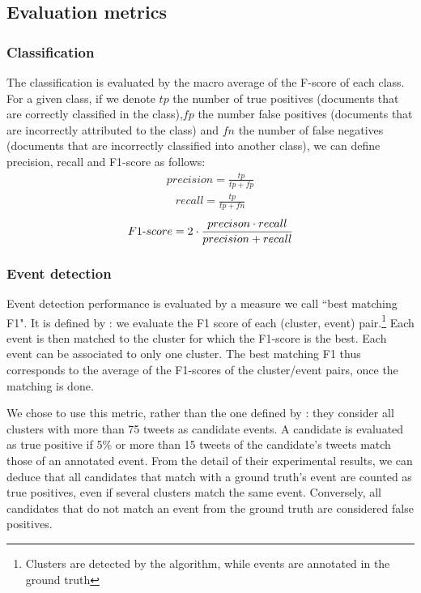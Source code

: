 \subsection{Evaluation metrics}

\subsubsection{Classification}
The classification is evaluated by the macro average of the F-score of each class. For a given class, if we denote $tp$ the number of true positives (documents that are correctly classified in the class),$fp$ the number false positives (documents that are incorrectly attributed to the class) and $fn$ the number of false negatives (documents that are incorrectly classified into another class), we can define precision, recall and F1-score as follows:
\begin{align}
precision = \frac{tp}{tp+fp}
\end{align}
\begin{align}
recall = \frac{tp}{tp+fn}
\end{align}
\begin{align}
F1{\text -}score = 2 \cdot \frac{precison \cdot recall}{precision + recall}
\end{align}

\subsubsection{Event detection}
\label{metric_best_matching}
Event detection performance is evaluated by a measure we call ``best matching F1". It is defined by \citet{yang1998study}: we evaluate the F1 score of each (cluster, event) pair.\footnote{Clusters are detected by the algorithm, while events are annotated in the ground truth} Each event is then matched to the cluster for which the F1-score is the best. Each event can be associated to only one cluster. The best matching F1 thus corresponds to the average of the F1-scores of the cluster/event pairs, once the matching is done.

We chose to use this metric, rather than the one defined by \citet{mcminn_real_2015}: they consider all clusters with more than 75 tweets as candidate events. A candidate is evaluated as true positive if 5\% or more than 15 tweets of the candidate's tweets match those of an annotated event. From the detail of their experimental results, we can deduce that all candidates that match with a ground truth's event are counted as true positives, even if several clusters match the same event. Conversely, all candidates that do not match an event from the ground truth are considered false positives. 

